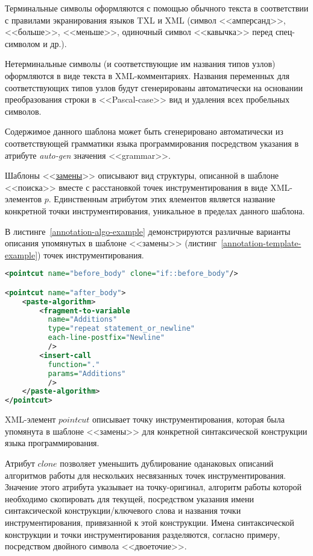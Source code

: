 Терминальные символы оформляются с помощью обычного текста в соответствии с правилами экранирования языков TXL и XML (символ <<амперсанд>>, <<больше>>, <<меньше>>, одиночный символ <<кавычка>> перед спец-символом и др.).

Нетерминальные символы (и соответствующие им названия типов узлов) оформляются в виде текста в XML-комментариях.
Названия переменных для соответствующих типов узлов будут сгенерированы автоматически на основании преобразования строки в <<Pascal-case>> вид и удаления всех пробельных символов.

Содержимое данного шаблона может быть сгенерировано автоматически из соответствующей грамматики языка программирования посредством указания в атрибуте \textit{auto-gen} значения <<grammar>>.

Шаблоны <<\underline{замены}>> описывают вид структуры, описанной в шаблоне <<поиска>> вместе с расстановкой точек инструментирования в виде XML-элементов $p$.
Единственным атрибутом этих ялементов является название конкретной точки инструментирования, уникальное в пределах данного шаблона.

В листинге~\ref{annotation-algo-example} демонстрируются различные варианты описания упомянутых в шаблоне <<замены>> (листинг~\ref{annotation-template-example}) точек инструментирования.

\begin{lstlisting}[frame=single, language=XML, label={annotation-algo-example}, caption={Пример описания алгоритмов для точек инструментирования.}]
<pointcut name="before_body" clone="if::before_body"/>

<pointcut name="after_body">
    <paste-algorithm>
        <fragment-to-variable
          name="Additions"
          type="repeat statement_or_newline"
          each-line-postfix="Newline"
          />
        <insert-call
          function="."
          params="Additions"
          />
    </paste-algorithm>
</pointcut>
\end{lstlisting}

XML-элемент $pointcut$ описывает точку инструментирования, которая была упомянута в шаблоне <<замены>> для конкретной синтаксической конструкции языка программирования.

Атрибут $clone$ позволяет уменьшить дублирование оданаковых описаний алгоритмов работы для нескольких несвязанных точек инструментирования.
Значение этого атрибута указывает на точку-оригинал, алгоритм работы которой необходимо скопировать для текущей, посредством указания имени синтаксической конструкции/ключевого слова и названия точки инструментирования, привязанной к этой конструкции.
Имена синтаксической конструкции и точки инструментирования разделяются, согласно примеру, посредством двойного символа <<двоеточие>>.

